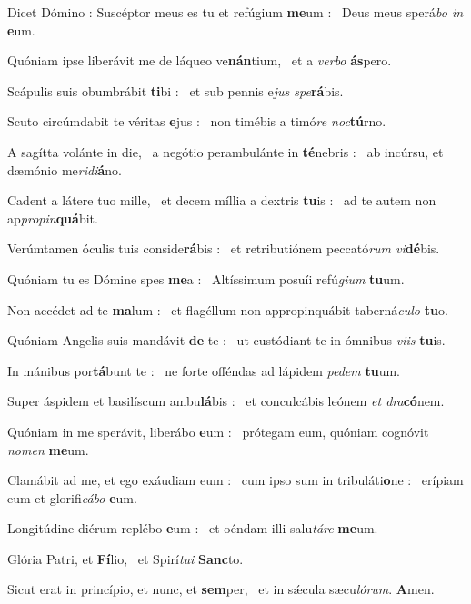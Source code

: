 \documentclass[12pt]{article} %
\newenvironment{psalmtext}{\leftskip 0.25in}{\vspace{2 mm}}
\let\oldgresixstar\gresixstar
\renewcommand{\gresixstar}{\textcolor{benred8}{\oldgresixstar}}
\let\oldgredagger\gredagger
\renewcommand{\gredagger}{\textcolor{benred8}{\oldgredagger}}
\begin{document}
\begin{psalmtext}
Dicet D\'{o}mino : Susc\'{e}ptor meus es tu et ref\'{u}gium \textbf{me}um : \gresixstar\ Deus meus sper\'{a}\emph{bo in} \textbf{e}um.

Qu\'{o}niam ipse liber\'{a}vit me de l\'{a}queo ve\textbf{n\'{a}n}tium, \gresixstar\ et a \emph{verbo} \textbf{\'{a}s}pero.

Sc\'{a}pulis suis obumbr\'{a}bit \textbf{ti}bi : \gresixstar\ et sub pennis e\emph{jus spe}\textbf{r\'{a}}bis.

Scuto circ\'{u}mdabit te v\'{e}ritas \textbf{e}jus : \gresixstar\ non tim\'{e}bis a tim\'{o}\emph{re noc}\textbf{t\'{u}}rno.

A sag\'{i}tta vol\'{a}nte in die, \gredagger\ a neg\'{o}tio perambul\'{a}nte in \textbf{t\'{e}}nebris : \gresixstar\ ab inc\'{u}rsu, et d\ae m\'{o}nio me\emph{ridi}\textbf{\'{a}}no.

Cadent a l\'{a}tere tuo mille, \gredagger\ et decem m\'{i}llia a dextris \textbf{tu}is : \gresixstar\ ad te autem non ap\emph{propin}\textbf{qu\'{a}}bit.

Ver\'{u}mtamen \'{o}culis tuis conside\textbf{r\'{a}}bis : \gresixstar\ et retributi\'{o}nem peccat\'{o}\emph{rum vi}\textbf{d\'{e}}bis.

Qu\'{o}niam tu es D\'{o}mine spes \textbf{me}a : \gresixstar\ Alt\'{i}ssimum posu\'{i}i ref\'{u}\emph{gium} \textbf{tu}um.

Non acc\'{e}det ad te \textbf{ma}lum : \gresixstar\ et flag\'{e}llum non appropinqu\'{a}bit tabern\'{a}\emph{culo} \textbf{tu}o.

Qu\'{o}niam Angelis suis mand\'{a}vit \textbf{de} te : \gresixstar\ ut cust\'{o}diant te in \'{o}mnibus \emph{viis} \textbf{tu}is.

In m\'{a}nibus por\textbf{t\'{a}}bunt te : \gresixstar\ ne forte off\'{e}ndas ad l\'{a}pidem \emph{pedem} \textbf{tu}um.

Super \'{a}spidem et basil\'{i}scum ambu\textbf{l\'{a}}bis : \gresixstar\ et conculc\'{a}bis le\'{o}nem \emph{et dra}\textbf{c\'{o}}nem.

Qu\'{o}niam in me sper\'{a}vit, liber\'{a}bo \textbf{e}um : \gresixstar\ pr\'{o}tegam eum, qu\'{o}niam cogn\'{o}vit \emph{nomen} \textbf{me}um.

Clam\'{a}bit ad me, et ego ex\'{a}udiam eum : \gredagger\ cum ipso sum in tribul\'{a}ti\textbf{o}ne : \gresixstar\ er\'{i}piam eum et glorifi\emph{c\'{a}bo} \textbf{e}um.

Longit\'{u}dine di\'{e}rum repl\'{e}bo \textbf{e}um : \gresixstar\ et o\'{e}ndam illi salu\emph{t\'{a}re} \textbf{me}um.

Gl\'{o}ria Patri, et \textbf{F\'{i}}lio, \gresixstar\ et Spir\'{i}\emph{tui} \textbf{Sanc}to.

Sicut erat in princ\'{i}pio, et nunc, et \textbf{sem}per, \gresixstar\ et in s\'{\ae}cula s\ae cu\emph{l\'{o}rum}. \textbf{A}men.

\end{psalmtext}
\end{document}
